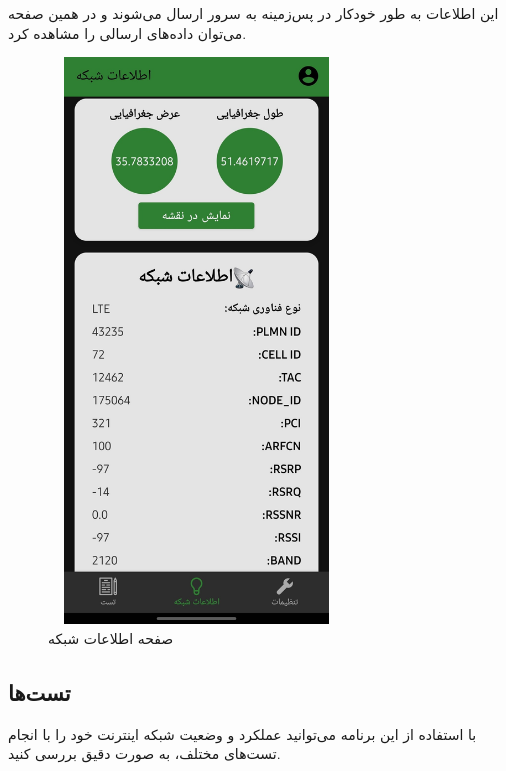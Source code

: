 \documentclass{report}
\begin{document}
این اطلاعات به طور خودکار در پس‌زمینه به سرور ارسال می‌شوند و در همین صفحه می‌توان داده‌های ارسالی را مشاهده کرد.

\begin{figure}[ht]
	\centering
		\includegraphics[width=0.7\textwidth,height=15cm,keepaspectratio]{Pic/info}
	\caption{صفحه اطلاعات شبکه}
	\label{fig:info}
\end{figure}

\subsection{تست‌ها}

با استفاده از این برنامه می‌توانید عملکرد و وضعیت شبکه اینترنت خود را با انجام تست‌های مختلف، به صورت دقیق بررسی کنید.
\end{document}
